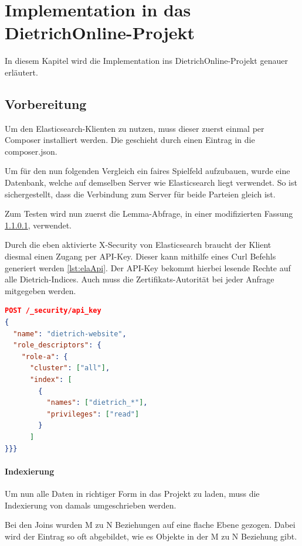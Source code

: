 \chapter{Implementation in das DietrichOnline-Projekt}

In diesem Kapitel wird die Implementation ins DietrichOnline-Projekt genauer erläutert.

\section{Vorbereitung}

Um den Elasticsearch-Klienten zu nutzen, muss dieser zuerst einmal per Composer installiert werden. Die geschieht durch einen Eintrag in die composer.json.

Um für den nun folgenden Vergleich ein faires Spielfeld aufzubauen, wurde eine Datenbank, welche auf demselben Server wie Elasticsearch liegt verwendet. So ist sichergestellt, dass die Verbindung zum Server für beide Parteien gleich ist.

Zum Testen wird nun zuerst die Lemma-Abfrage, in einer modifizierten Fassung \ref{lemmaIndexierungEla}, verwendet.

Durch die eben aktivierte X-Security von Elasticsearch braucht der Klient diesmal einen Zugang per API-Key. Dieser kann mithilfe eines Curl Befehls generiert werden \ref{lst:elaApi}. Der API-Key bekommt hierbei lesende Rechte auf alle Dietrich-Indices. Auch muss die Zertifikats-Autorität bei jeder Anfrage mitgegeben werden. 

\begin{lstlisting}[language=JSON, frame=single, label={lst:elaApi}] 
POST /_security/api_key
{
  "name": "dietrich-website",
  "role_descriptors": { 
    "role-a": {
      "cluster": ["all"],
      "index": [
        {
          "names": ["dietrich_*"],
          "privileges": ["read"]
        }
      ]
}}}
\end{lstlisting}


\subsubsection{Indexierung}
\label{lemmaIndexierungEla}

Um nun alle Daten in richtiger Form in das Projekt zu laden, muss die Indexierung von damals umgeschrieben werden. 

Bei den Joins wurden M zu N Beziehungen auf eine flache Ebene gezogen. Dabei wird der Eintrag so oft abgebildet, wie es Objekte in der M zu N Beziehung gibt. 

